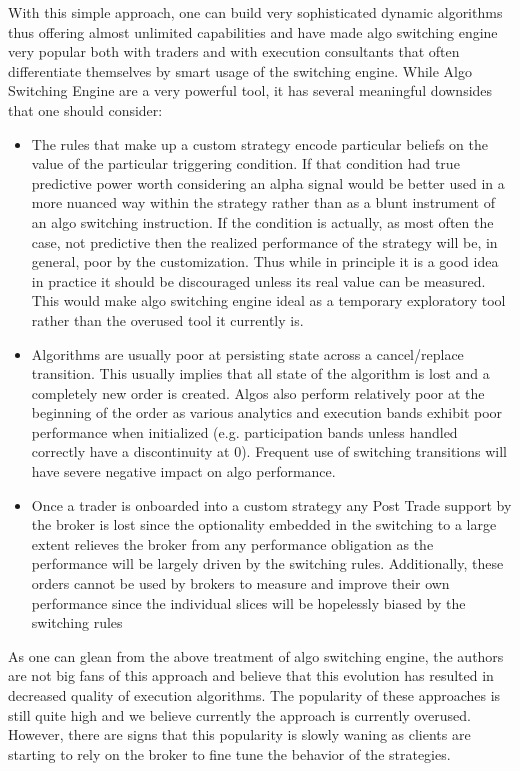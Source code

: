 With this simple approach, one can build very sophisticated dynamic algorithms thus offering almost unlimited capabilities and have made algo switching engine very popular both with traders and with execution consultants that often differentiate themselves by smart usage of the switching engine. While Algo Switching Engine are a very powerful tool, it has several meaningful downsides that one should consider:
\begin{itemize}
\item The rules that make up a custom strategy encode particular beliefs on the value of the particular triggering condition. If that condition had true predictive power worth considering an alpha signal would be better used in a more nuanced way within the strategy rather than as a blunt instrument of an algo switching instruction. If the condition is actually, as most often the case, not predictive then the realized performance of the strategy will be, in general, poor by the customization. Thus while in principle it is a good idea in practice it should be discouraged unless its real value can be measured. This would make algo switching engine ideal as a temporary exploratory tool rather than the overused tool it currently is.
\item  Algorithms are usually poor at persisting state across a cancel/replace transition. This usually implies that all state of the algorithm is lost and a completely new order is created. Algos also perform relatively poor at the beginning of the order as various analytics and execution bands exhibit poor performance when initialized (e.g. participation bands unless handled correctly have a discontinuity at 0). Frequent use of switching transitions will have severe negative impact on algo performance.
\item Once a trader is onboarded into a custom strategy any Post Trade support by the broker is lost since the optionality embedded in the switching to a large extent relieves the broker from any performance obligation as the performance will be largely driven by the switching rules. Additionally, these orders cannot be used by brokers to measure and improve their own performance since the individual slices will be hopelessly biased by the switching rules
\end{itemize}


As one can glean from the above treatment of algo switching engine, the authors are not big fans of this approach and believe that this evolution has resulted in decreased quality of execution algorithms. The popularity of these approaches is still quite high and we believe currently the approach is currently overused. However, there are signs that this popularity is slowly waning as clients are starting to rely on the broker to fine tune the behavior of the strategies. \\


